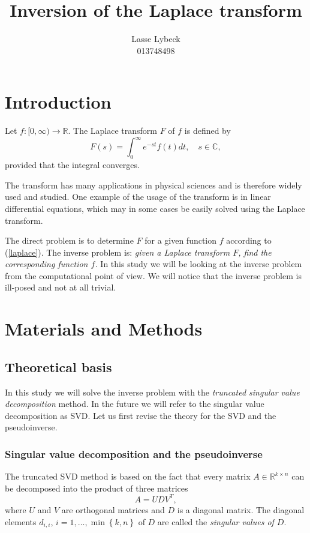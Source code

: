 \documentclass[12pt,a4]{article}
\title{Inversion of the Laplace transform}
\author{Lasse Lybeck\\013748498}
\newcommand{\R}{{\mathbb R}}
\newcommand{\C}{{\mathbb C}}
\begin{document}
\maketitle

\section{Introduction}

Let $f:[0,\infty)\rightarrow \R$. The Laplace transform $F$ of $f$ is defined by
\begin{equation}\label{laplace}
 F(s) = \int_0^\infty e^{-st}f(t)dt,\quad s\in\C ,
\end{equation}
provided that the integral converges.

The transform has many applications in physical sciences and is therefore widely used and studied. One example of the usage of the transform is in linear differential equations, which may in some cases be easily solved using the Laplace transform.

The direct problem is to determine $F$ for a given function $f$ according to (\ref{laplace}). The inverse problem is: {\em given a Laplace transform $F$, find the corresponding function $f$.} In this study we will be looking at the inverse problem from the computational point of view. We will notice that the inverse problem is ill-posed and not at all trivial.




\section{Materials and Methods}\label{sec:methods}

\subsection{Theoretical basis}

In this study we will solve the inverse problem with the \emph{truncated singular value decomposition} method. In the future we will refer to the singular value decomposition as SVD. Let us first revise the theory for the SVD and the pseudoinverse.

\subsubsection{Singular value decomposition and the pseudoinverse}
\label{sec:svd}

The truncated SVD method is based on the fact that every matrix $A \in \R^{k \times n}$ can be decomposed into the product of three matrices
\begin{equation}
A = U D V^T,
\end{equation}
where $U$ and $V$ are orthogonal matrices and $D$ is a diagonal matrix. The diagonal elements $d_{i,i}$, $i = 1, \ldots , \min \left\{ k,n \right\}$ of $D$ are called the \emph{singular values of $D$}.
\end{document}
